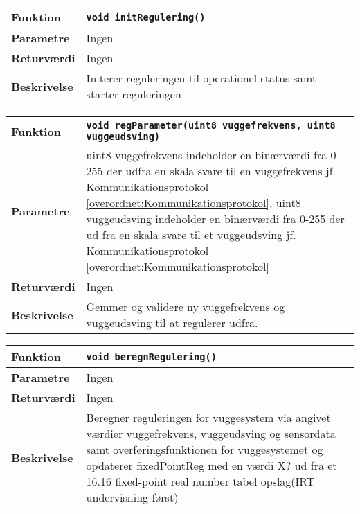 \begin{center}
    \begin{tabular}{ | l | p{} |}
    \hline
    \textbf{Funktion}	& \verb+void initRegulering() +								\\ \hline
    \textbf{Parametre} 	& Ingen														\\ \hline
    \textbf{Returværdi}	& Ingen														\\ \hline
    \textbf{Beskrivelse}	& Initerer reguleringen til operationel status samt starter reguleringen	\\ \hline
    \end{tabular}
\end{center}

\begin{center}
    \begin{tabular}{ | l | p{} |}
    \hline
    \textbf{Funktion}	& \verb+void regParameter(uint8 vuggefrekvens, uint8 vuggeudsving) +								\\ \hline
    \textbf{Parametre} 	& uint8 vuggefrekvens indeholder en binærværdi fra 0-255 der udfra en skala svare til en vuggefrekvens jf. Kommunikationsprotokol \ref{overordnet:Kommunikationsprotokol}, uint8 vuggeudsving indeholder en binærværdi fra 0-255 der ud fra en skala svare til et vuggeudsving jf. Kommunikationsprotokol \ref{overordnet:Kommunikationsprotokol}						\\ \hline
    \textbf{Returværdi}	& Ingen														\\ \hline
    \textbf{Beskrivelse}	& Gemmer og validere ny vuggefrekvens og vuggeudsving til at regulerer udfra. 	\\ \hline
    \end{tabular}
\end{center}


\begin{center}
    \begin{tabular}{ | l | p{} |}
    \hline
    \textbf{Funktion}	& \verb+void beregnRegulering() +								\\ \hline
    \textbf{Parametre} 	& Ingen						\\ \hline
    \textbf{Returværdi}	& Ingen														\\ \hline
    \textbf{Beskrivelse}	& Beregner reguleringen for vuggesystem via angivet værdier vuggefrekvens, vuggeudsving og sensordata samt overføringsfunktionen for vuggesystemet og opdaterer fixedPointReg med en værdi X? ud fra et 16.16 fixed-point real number tabel opslag(IRT undervisning først)	\\ \hline
    \end{tabular}
\end{center}

